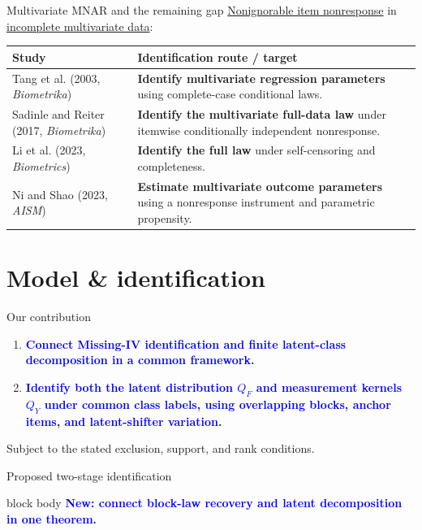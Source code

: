 \documentclass[aspectratio=169,10pt]{beamer}
\newcommand{\slidebody}{\fontsize{10.6pt}{12.6pt}\selectfont}
\newcommand{\slideannotation}{\fontsize{8pt}{9.6pt}\selectfont}
\renewcommand{\footnotesize}{\slidebody}
\renewcommand{\arraystretch}{1.14}
\newcommand{\bluekey}[1]{\textcolor{Blue}{\textbf{#1}}}
\newcommand{\term}[1]{\underline{#1}}
\newenvironment{takeaway}{%
  \begin{beamercolorbox}[rounded=true,sep=.7em,wd=\linewidth]{block body}%
  \color{Navy}\bfseries}{\end{beamercolorbox}}
\begin{document}
\begin{frame}{Multivariate MNAR and the remaining gap}
\term{Nonignorable item nonresponse} in \term{incomplete multivariate data}:
\par\smallskip
{\footnotesize
\renewcommand{\arraystretch}{1.0}
\begin{tabular}{@{}>{\raggedright\arraybackslash}p{.32\linewidth}>{\raggedright\arraybackslash}p{.65\linewidth}@{}}
\toprule
\textbf{Study} & \textbf{Identification route / target}\\
\midrule
Tang et al. (2003, \emph{Biometrika}) & \textbf{Identify multivariate regression parameters} using complete-case conditional laws.\\[.3em]
Sadinle and Reiter (2017, \emph{Biometrika}) & \textbf{Identify the multivariate full-data law} under itemwise conditionally independent nonresponse.\\[.3em]
Li et al. (2023, \emph{Biometrics}) & \textbf{Identify the full law} under self-censoring and completeness.\\[.3em]
Ni and Shao (2023, \emph{AISM}) & \textbf{Estimate multivariate outcome parameters} using a nonresponse instrument and parametric propensity.\\
\bottomrule
\end{tabular}
}
\par\smallskip
\end{frame}

\section{Model \& identification}
\begin{frame}{Our contribution}
\begin{enumerate}
  \setlength{\itemsep}{2em}
  \item \bluekey{Connect Missing-IV identification and finite latent-class decomposition in a common framework.}
  \item \bluekey{Identify both the latent distribution $Q_F$ and measurement kernels $Q_Y$ under common class labels, using overlapping blocks, anchor items, and latent-shifter variation.}
\end{enumerate}
\bigskip
{\slideannotation Subject to the stated exclusion, support, and rank conditions.}
\end{frame}

\begin{frame}{Proposed two-stage identification}
\centering

\medskip
\begin{takeaway}
\bluekey{New: connect block-law recovery and latent decomposition in one theorem.}
\end{takeaway}
\end{frame}
\end{document}
